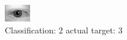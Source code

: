 \begin{figure}[h!]
\begin{center}
\includegraphics[width=0.60\columnwidth]{figures/ID577_class_2_target_3.png}
\end{center}
\caption{ Classification: 2 actual target: 3}
\label{fig:ID577_class_2_target_3}
\end{figure}
